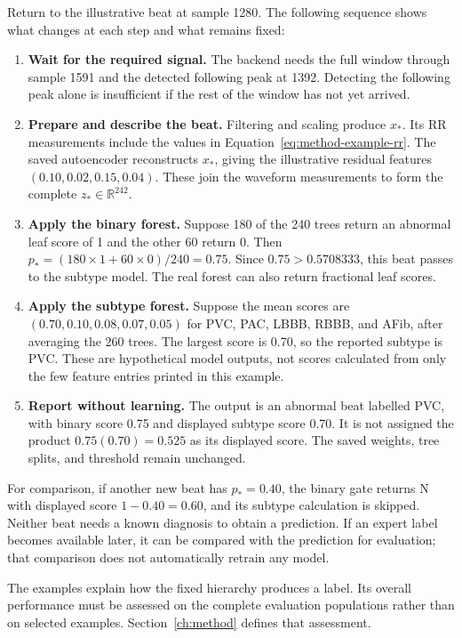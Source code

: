 Return to the illustrative beat at sample 1280. The following sequence
shows what changes at each step and what remains fixed:
\begin{enumerate}
\item \textbf{Wait for the required signal.} The backend needs the full
window through sample 1591 and the detected following peak at 1392.
Detecting the following peak alone is insufficient if the rest of the
window has not yet arrived.
\item \textbf{Prepare and describe the beat.} Filtering and scaling produce
$x_*$. Its RR measurements include the values in
Equation~\ref{eq:method-example-rr}. The saved autoencoder reconstructs
$x_*$, giving the illustrative residual features
$(0.10,0.02,0.15,0.04)$. These join the waveform measurements to form
the complete $z_*\in\mathbb{R}^{242}$.
\item \textbf{Apply the binary forest.} Suppose 180 of the 240 trees return
an abnormal leaf score of 1 and the other 60 return 0. Then
$p_*=(180\times1+60\times0)/240=0.75$. Since
$0.75>0.5708333$, this beat passes to the subtype model. The real forest
can also return fractional leaf scores.
\item \textbf{Apply the subtype forest.} Suppose the mean scores are
$(0.70,0.10,0.08,0.07,0.05)$ for PVC, PAC, LBBB, RBBB, and AFib,
after averaging the 260 trees.
The largest score is 0.70, so the reported subtype is PVC. These are
hypothetical model outputs, not scores calculated from only the few feature
entries printed in this example.
\item \textbf{Report without learning.} The output is an abnormal beat
labelled PVC, with binary score 0.75 and displayed subtype score 0.70.
It is not assigned the product $0.75(0.70)=0.525$ as its displayed score.
The saved weights, tree splits, and threshold remain unchanged.
\end{enumerate}

For comparison, if another new beat has $p_*=0.40$, the binary gate returns
N with displayed score $1-0.40=0.60$, and its subtype calculation is skipped.
Neither beat needs a known diagnosis to obtain a prediction. If an expert
label becomes available later, it can be compared with the prediction for
evaluation; that comparison does not automatically retrain any model.




The examples explain how the fixed hierarchy produces a label. Its overall
performance must be assessed on the complete evaluation populations rather
than on selected examples. Section~\ref{ch:method} defines that assessment.
